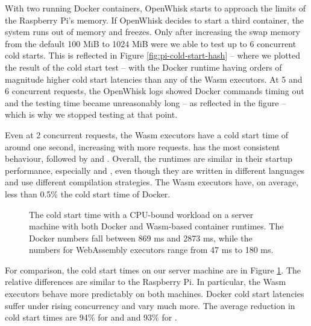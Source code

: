With two running Docker containers, OpenWhisk starts to approach the limits of the Raspberry Pi's memory. If OpenWhisk decides to start a third container, the system runs out of memory and freezes. Only after increasing the swap memory from the default 100 MiB to 1024 MiB were we able to test up to 6 concurrent cold starts.
This is reflected in Figure \ref{fig:pi-cold-start-hash} -- where we plotted the result of the cold start test -- with the Docker runtime having orders of magnitude higher cold start latencies than any of the Wasm executors. At 5 and 6 concurrent requests, the OpenWhisk logs showed Docker commands timing out and the testing time became unreasonably long -- as reflected in the figure -- which is why we stopped testing at that point.

Even at 2 concurrent requests, the Wasm executors have a cold start time of around one second, increasing with more requests.  has the most consistent behaviour, followed by  and . Overall, the runtimes are similar in their startup performance, especially  and , even though they are written in different languages and use different compilation strategies. The Wasm executors have, on average, less than 0.5\% the cold start time of Docker.


\begin{figure}
    \begin{center}
        
    \end{center}
    \caption{The cold start time with a CPU-bound workload on a server machine with both Docker and Wasm-based container runtimes. The Docker numbers fall between 869 ms and 2873 ms, while the numbers for WebAssembly executors range from 47 ms to 180 ms.}
    \label{fig:pc-cold-start-hash}
\end{figure}

For comparison, the cold start times on our  server machine are in Figure \ref{fig:pc-cold-start-hash}. The relative differences are similar to the Raspberry Pi. In particular, the Wasm executors behave more predictably on both machines. Docker cold start latencies suffer under rising concurrency and vary much more.
The average reduction in cold start times are 94\% for  and  and 93\% for .

